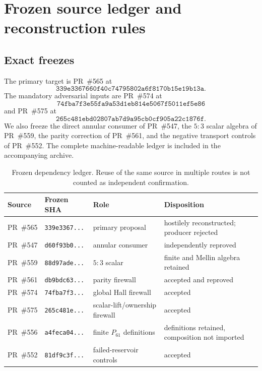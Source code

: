 \documentclass[11pt]{article}
\begin{document}
\tableofcontents
\newpage

\section{Frozen source ledger and reconstruction rules}

\subsection{Exact freezes}
The primary target is PR~\#565 at
\[
\texttt{339e3367660f40c74795802a6f8170b15e19b13a}.
\]
The mandatory adversarial inputs are PR~\#574 at
\[
\texttt{74fba7f3e55fa9a53d1eb814e5067f5011ef5e86}
\]
and PR~\#575 at
\[
\texttt{265c481ebd02807ab7d9a95cb0cf905a22c1876f}.
\]
We also freeze the direct annular consumer of PR~\#547, the $5{:}3$ scalar algebra of PR~\#559, the parity correction of PR~\#561, and the negative transport controls of PR~\#552.  The complete machine-readable ledger is included in the accompanying archive.

\begin{table}[H]
\centering
\small
\begin{tabularx}{\textwidth}{@{}l l l Y@{}}
\toprule
Source & Frozen SHA & Role & Disposition \\
\midrule
PR~\#565 & \texttt{339e3367...} & primary proposal & hostilely reconstructed; producer rejected \\
PR~\#547 & \texttt{d60f93b0...} & annular consumer & independently reproved \\
PR~\#559 & \texttt{88d97ade...} & $5{:}3$ scalar & finite and Mellin algebra retained \\
PR~\#561 & \texttt{db9bdc63...} & parity firewall & accepted and reproved \\
PR~\#574 & \texttt{74fba7f3...} & global Hall firewall & accepted \\
PR~\#575 & \texttt{265c481e...} & scalar-lift/ownership firewall & accepted \\
PR~\#556 & \texttt{a4feca04...} & finite $P_{61}$ definitions & definitions retained, composition not imported \\
PR~\#552 & \texttt{81df9c3f...} & failed-reservoir controls & accepted \\
\bottomrule
\end{tabularx}
\caption{Frozen dependency ledger.  Reuse of the same source in multiple routes is not counted as independent confirmation.}
\end{table}
\end{document}

